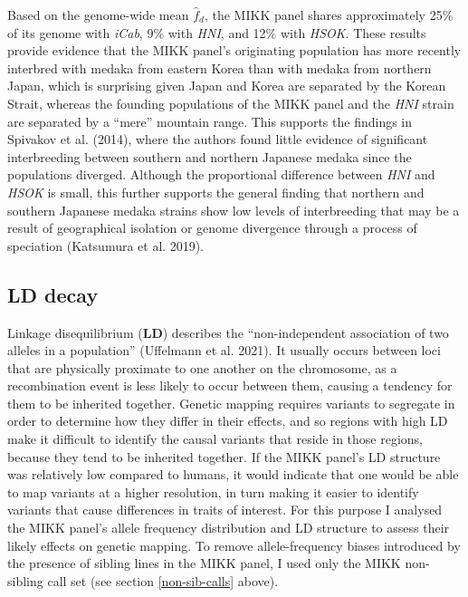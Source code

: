 \documentclass[
]{book}
\begin{document}
Based on the genome-wide mean \(\hat{f}_d\), the MIKK panel shares approximately 25\% of its genome with \emph{iCab}, 9\% with \emph{HNI}, and 12\% with \emph{HSOK}. These results provide evidence that the MIKK panel's originating population has more recently interbred with medaka from eastern Korea than with medaka from northern Japan, which is surprising given Japan and Korea are separated by the Korean Strait, whereas the founding populations of the MIKK panel and the \emph{HNI} strain are separated by a ``mere'' mountain range. This supports the findings in Spivakov et al. (2014), where the authors found little evidence of significant interbreeding between southern and northern Japanese medaka since the populations diverged. Although the proportional difference between \emph{HNI} and \emph{HSOK} is small, this further supports the general finding that northern and southern Japanese medaka strains show low levels of interbreeding that may be a result of geographical isolation or genome divergence through a process of speciation (Katsumura et al. 2019).

\hypertarget{ld-decay-sec}{%
\subsection{LD decay}\label{ld-decay-sec}}

Linkage disequilibrium (\textbf{LD}) describes the ``non-independent association of two alleles in a population'' (Uffelmann et al. 2021). It usually occurs between loci that are physically proximate to one another on the chromosome, as a recombination event is less likely to occur between them, causing a tendency for them to be inherited together. Genetic mapping requires variants to segregate in order to determine how they differ in their effects, and so regions with high LD make it difficult to identify the causal variants that reside in those regions, because they tend to be inherited together. If the MIKK panel's LD structure was relatively low compared to humans, it would indicate that one would be able to map variants at a higher resolution, in turn making it easier to identify variants that cause differences in traits of interest. For this purpose I analysed the MIKK panel's allele frequency distribution and LD structure to assess their likely effects on genetic mapping. To remove allele-frequency biases introduced by the presence of sibling lines in the MIKK panel, I used only the MIKK non-sibling call set (see section \ref{non-sib-calls} above).
\end{document}

